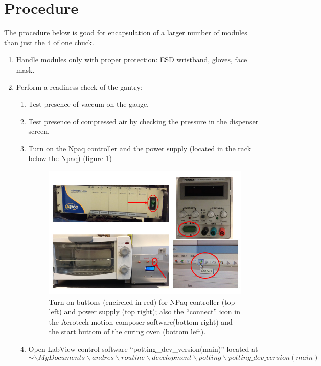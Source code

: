 \documentclass[12pt]{unlsilabsop}
\begin{document}
\section{Procedure}

The procedure below is good for encapsulation of a larger number of modules than just the 4 of one chuck.
\begin{enumerate}
    \item Handle modules only with proper protection: ESD wristband, gloves, face mask.
    \item Perform a readiness check of the gantry:
    \begin{enumerate}
	\item Test presence of vaccum on the gauge.
	\item Test presence of compressed air by checking the pressure in the dispenser screen.
        \item Turn on the Npaq controller and the power supply (located in the rack below the Npaq) (figure \ref{turn_on})
          \begin{figure}[ht]
            \begin{center}
              \includegraphics[width=\textwidth]{img/turn_on.jpg}
              \caption{Turn on buttons (encircled in red) for NPaq controller (top left) and power supply (top right); also the ``connect'' icon in the Aerotech motion composer software(bottom right) and the start buttom of the curing oven (bottom left).}
              \label{turn_on}
            \end{center}
          \end{figure}
        \item Open LabView control software ``potting\_dev\_version(main)'' located at $$ \sim\backslash MyDocuments\backslash andres\backslash routine\backslash development\backslash potting \backslash potting\_dev\_version(main)$$

\end{enumerate}
\end{enumerate}
\end{document}
